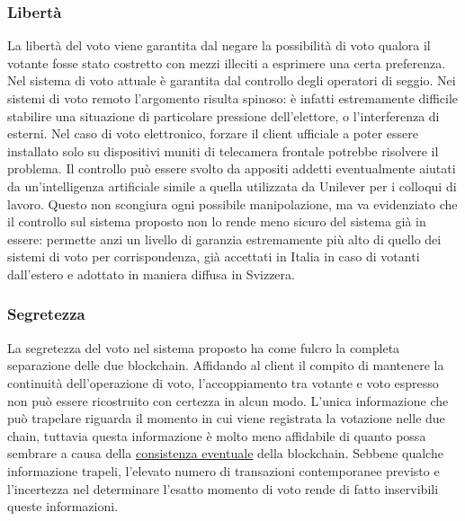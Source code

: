 		\subsubsection{Libertà}\label{subsec:liberta_voto}
			La libertà del voto viene garantita dal negare la possibilità di voto qualora il votante fosse stato costretto con mezzi illeciti a esprimere una certa preferenza. Nel sistema di voto attuale è garantita dal controllo degli operatori di seggio. Nei sistemi di voto remoto l'argomento risulta spinoso: è infatti estremamente difficile stabilire una situazione di particolare pressione dell'elettore, o l'interferenza di esterni. Nel caso di voto elettronico, forzare il client ufficiale a poter essere installato solo su dispositivi muniti di telecamera frontale potrebbe risolvere il problema. Il controllo può essere svolto da appositi addetti eventualmente aiutati da un'intelligenza artificiale simile a quella utilizzata da Unilever \cite{ai_unilever} per i colloqui di lavoro. Questo non scongiura ogni possibile manipolazione, ma va evidenziato che il controllo sul sistema proposto non lo rende meno sicuro del sistema già in essere: permette anzi un livello di garanzia estremamente più alto di quello dei sistemi di voto per corrispondenza, già accettati in Italia in caso di votanti dall'estero e adottato in maniera diffusa in Svizzera.
		
		\subsubsection{Segretezza}
			La segretezza del voto nel sistema proposto ha come fulcro la completa separazione delle due blockchain. Affidando al client il compito di mantenere la continuità dell'operazione di voto, l'accoppiamento tra votante e voto espresso non può essere ricostruito con certezza in alcun modo. L'unica informazione che può trapelare riguarda il momento in cui viene registrata la votazione nelle due chain, tuttavia questa informazione è molto meno affidabile di quanto possa sembrare a causa della \href{sec:teorema_CAP}{consistenza eventuale} della blockchain. Sebbene qualche informazione trapeli, l'elevato numero di transazioni contemporanee previsto e l'incertezza nel determinare l'esatto momento di voto rende di fatto inservibili queste informazioni.
	
	
